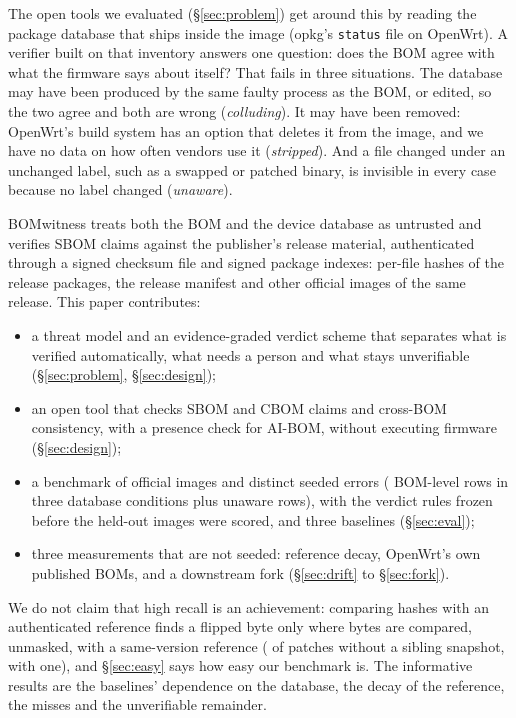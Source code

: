 \documentclass[sigconf,nonacm]{acmart}
\newcommand{\tool}{BOMwitness}
\begin{document}
The open tools we evaluated (\S\ref{sec:problem}) get around this by reading the package database that ships inside the image (opkg's \texttt{status} file on OpenWrt). A verifier built on that inventory answers one question: does the BOM agree with what the firmware says about itself? That fails in three situations. The database may have been produced by the same faulty process as the BOM, or edited, so the two agree and both are wrong (\emph{colluding}). It may have been removed: OpenWrt's build system has an option that deletes it from the image, and we have no data on how often vendors use it (\emph{stripped}). And a file changed under an unchanged label, such as a swapped or patched binary, is invisible in every case because no label changed (\emph{unaware}).

\tool{} treats both the BOM and the device database as untrusted and verifies SBOM claims against the publisher's release material, authenticated through a signed checksum file and signed package indexes: per-file hashes of the release packages, the release manifest and other official images of the same release. This paper contributes:
\begin{itemize}
\item a threat model and an evidence-graded verdict scheme that separates what is verified automatically, what needs a person and what stays unverifiable (\S\ref{sec:problem}, \S\ref{sec:design});
\item an open tool that checks SBOM and CBOM claims and cross-BOM consistency, with a presence check for AI-BOM, without executing firmware (\S\ref{sec:design});
\item a benchmark of \nImages{} official images and \nAllDistinctErr{} distinct seeded errors (\nAllBomRows{} BOM-level rows in three database conditions plus \nAllUnawareRows{} unaware rows), with the verdict rules frozen before the held-out images were scored, and three baselines (\S\ref{sec:eval});
\item three measurements that are not seeded: reference decay, OpenWrt's own published BOMs, and a downstream fork (\S\ref{sec:drift} to \S\ref{sec:fork}).
\end{itemize}

We do not claim that high recall is an achievement: comparing hashes with an authenticated reference finds a flipped byte only where bytes are compared, unmasked, with a same-version reference (\kMSixNs{} of \kMSixCases{} patches without a sibling snapshot, \kMSixBw{} with one), and \S\ref{sec:easy} says how easy our benchmark is. The informative results are the baselines' dependence on the database, the decay of the reference, the misses and the unverifiable remainder.
\end{document}
